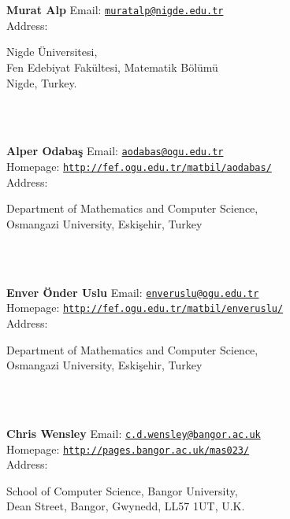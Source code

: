 \documentclass[a4paper,11pt]{report}
\begin{document}
\begin{titlepage}
\mbox{}\\
{\mbox{}\\
\small \noindent \textbf{ Murat Alp   }  Email: \href{mailto://muratalp@nigde.edu.tr} {\texttt{muratalp@nigde.edu.tr}}\\
  Address: \begin{minipage}[t]{8cm}\noindent
 Nigde {\"U}niversitesi,\\
 Fen Edebiyat Fak{\"u}ltesi, Matematik B{\"o}l{\"u}m{\"u}\\
 Nigde, Turkey. \end{minipage}
}\\
{\mbox{}\\
\small \noindent \textbf{ Alper Odaba{\c s}    }  Email: \href{mailto://aodabas@ogu.edu.tr} {\texttt{aodabas@ogu.edu.tr}}\\
  Homepage: \href{http://fef.ogu.edu.tr/matbil/aodabas/} {\texttt{http://fef.ogu.edu.tr/matbil/aodabas/}}\\
  Address: \begin{minipage}[t]{8cm}\noindent
 Department of Mathematics and Computer Science,\\
 Osmangazi University, Eski{\c s}ehir, Turkey \end{minipage}
}\\
{\mbox{}\\
\small \noindent \textbf{ Enver {\"O}nder Uslu    }  Email: \href{mailto://enveruslu@ogu.edu.tr} {\texttt{enveruslu@ogu.edu.tr}}\\
  Homepage: \href{http://fef.ogu.edu.tr/matbil/enveruslu/} {\texttt{http://fef.ogu.edu.tr/matbil/enveruslu/}}\\
  Address: \begin{minipage}[t]{8cm}\noindent
 Department of Mathematics and Computer Science,\\
 Osmangazi University, Eski{\c s}ehir, Turkey \end{minipage}
}\\
{\mbox{}\\
\small \noindent \textbf{ Chris Wensley    }  Email: \href{mailto://c.d.wensley@bangor.ac.uk} {\texttt{c.d.wensley@bangor.ac.uk}}\\
  Homepage: \href{http://pages.bangor.ac.uk/~mas023/} {\texttt{http://pages.bangor.ac.uk/\texttt{}mas023/}}\\
  Address: \begin{minipage}[t]{8cm}\noindent
 School of Computer Science, Bangor University,\\
 Dean Street, Bangor, Gwynedd, LL57 1UT, U.K. \end{minipage}
}\\
\end{titlepage}
\end{document}
